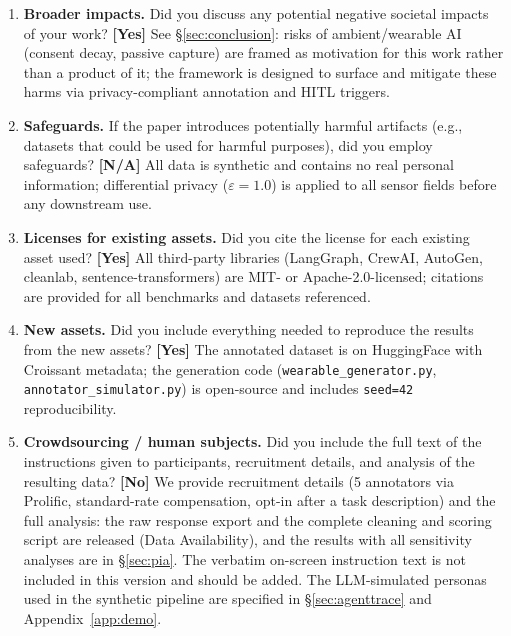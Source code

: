 \documentclass{article}
\newcommand{\answerYes}[1]{\textbf{[Yes]} #1}
\newcommand{\answerNo}[1]{\textbf{[No]} #1}
\newcommand{\answerNA}[1]{\textbf{[N/A]} #1}
\begin{document}
\begin{enumerate}
\item[\textbf{10.}] \textbf{Broader impacts.}
Did you discuss any potential negative societal impacts of your work?
\answerYes{See \S\ref{sec:conclusion}: risks of ambient/wearable AI (consent
  decay, passive capture) are framed as motivation for this work rather than
  a product of it; the framework is designed to surface and mitigate
  these harms via privacy-compliant annotation and HITL triggers.}

\item[\textbf{11.}] \textbf{Safeguards.}
If the paper introduces potentially harmful artifacts (e.g., datasets
that could be used for harmful purposes), did you employ safeguards?
\answerNA{All data is synthetic and contains no real personal
  information; differential privacy ($\varepsilon{=}1.0$) is applied
  to all sensor fields before any downstream use.}

\item[\textbf{12.}] \textbf{Licenses for existing assets.}
Did you cite the license for each existing asset used?
\answerYes{All third-party libraries (LangGraph, CrewAI, AutoGen,
  cleanlab, sentence-transformers) are MIT- or Apache-2.0-licensed;
  citations are provided for all benchmarks and datasets referenced.}

\item[\textbf{13.}] \textbf{New assets.}
Did you include everything needed to reproduce the results from the
new assets?
\answerYes{The annotated dataset is on HuggingFace with Croissant
  metadata; the generation code (\texttt{wearable\_generator.py},
  \texttt{annotator\_simulator.py}) is open-source and includes
  \texttt{seed=42} reproducibility.}

\item[\textbf{14.}] \textbf{Crowdsourcing / human subjects.}
Did you include the full text of the instructions given to
participants, recruitment details, and analysis of the resulting data?
\answerNo{We provide recruitment details (5 annotators via Prolific,
  standard-rate compensation, opt-in after a task description) and the full
  analysis: the raw response export and the complete cleaning and scoring
  script are released (Data Availability), and the results with all
  sensitivity analyses are in \S\ref{sec:pia}. The verbatim on-screen
  instruction text is not included in this version and should be added. The
  LLM-simulated personas used in the synthetic pipeline are specified in
  \S\ref{sec:agenttrace} and Appendix~\ref{app:demo}.}


\end{enumerate}
\end{document}
